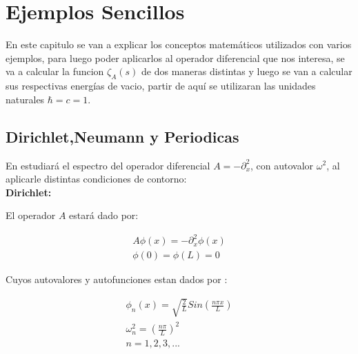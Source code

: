 \chapter{Ejemplos Sencillos}

    
    En este capitulo se van a explicar los conceptos matemáticos utilizados con varios ejemplos, para luego poder aplicarlos al operador diferencial que nos interesa, se va a calcular la funcion $ \zeta _A (s) $ de dos maneras distintas y luego se van a calcular sus respectivas energías de vacio, partir de aquí se utilizaran las unidades naturales $\hbar=c=1$.

\section{Dirichlet,Neumann y Periodicas}

En estudiará el espectro del operador diferencial $A = - \partial ^2 _x$, con autovalor $\omega ^2$, al aplicarle distintas condiciones de contorno: \\

\textbf{Dirichlet:}

El operador $A$ estará dado por:

\begin{equation}
\begin{array}{c}
	A \phi (x) = - \partial _x ^2 \phi (x) \\
    \phi (0) = \phi(L) = 0 
\end{array}
\end{equation}



Cuyos autovalores y autofunciones estan dados por  : 

\begin{equation}
\begin{array}{c}
	\phi _n (x) = \sqrt{\frac{2}{L}} Sin( \frac{n \pi x}{L} ) \\
	\omega _n ^2 = \left( \frac{n \pi }{L} \right) ^2 \\
	n = 1,2,3, ...
\end{array}
\end{equation}

